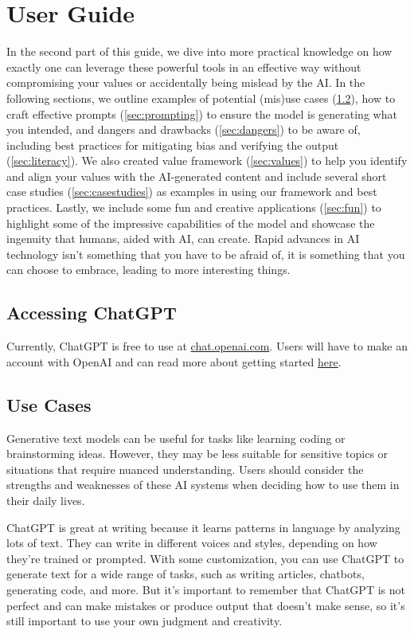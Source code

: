 \documentclass[12pt]{article}
\begin{document}
\section{User Guide}\label{sec:part2}
In the second part of this guide, we dive into more practical knowledge on how exactly one can leverage these powerful tools in an effective way without compromising your values or accidentally being mislead by the AI. In the following sections, we outline examples of potential (mis)use cases (\ref{sec:usecases}), how to craft effective prompts (\ref{sec:prompting}) to ensure the model is generating what you intended, and dangers and drawbacks (\ref{sec:dangers}) to be aware of, including best practices for mitigating bias and verifying the output (\ref{sec:literacy}). We also created value framework (\ref{sec:values}) to help you identify and align your values with the AI-generated content and include several short case studies (\ref{sec:casestudies}) as examples in using our framework and best practices. Lastly, we include some fun and creative applications (\ref{sec:fun}) to highlight some of the impressive capabilities of the model and showcase the ingenuity that humans, aided with AI, can create. Rapid advances in AI technology isn't something that you have to be afraid of, it is something that you can choose to embrace, leading to more interesting things. 

\subsection{Accessing ChatGPT}\label{sec:access}
Currently, ChatGPT is free to use at \href{https://chat.openai.com}{chat.openai.com}. Users will have to make an account with OpenAI and can read more about getting started \href{https://openai.com/blog/chatgpt}{here}.

\subsection{Use Cases}\label{sec:usecases} 
Generative text models can be useful for tasks like learning coding or brainstorming ideas. However, they may be less suitable for sensitive topics or situations that require nuanced understanding. Users should consider the strengths and weaknesses of these AI systems when deciding how to use them in their daily lives.

ChatGPT is great at writing because it learns patterns in language by analyzing lots of text. They can write in different voices and styles, depending on how they're trained or prompted. With some customization, you can use ChatGPT to generate text for a wide range of tasks, such as writing articles, chatbots, generating code, and more. But it's important to remember that ChatGPT is not perfect and can make mistakes or produce output that doesn't make sense, so it's still important to use your own judgment and creativity.
\end{document}
